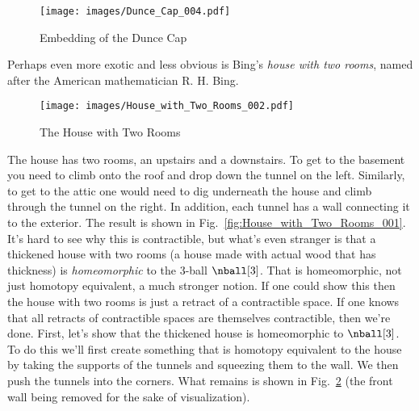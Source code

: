 \documentclass{book}                                                           %
\begin{document}
                \begin{figure}[H]
                    \centering
                    \captionsetup{type=figure}
                    \texttt{[image: images/Dunce\_Cap\_004.pdf]}
                    \caption{Embedding of the Dunce Cap}
                    \label{fig:Dunce_Cap_003}
                \end{figure}
                Perhaps even more exotic and less obvious is Bing's
                \textit{house with two rooms}, named after the American
                mathematician R. H. Bing.
                \begin{figure}[H]
                    \centering
                    \captionsetup{type=figure}
                    \texttt{[image: images/House\_with\_Two\_Rooms\_002.pdf]}
                    \caption{The House with Two Rooms}
                    \label{fig:House_with_Two_Rooms_002}
                \end{figure}
                The house has two rooms, an upstairs and a downstairs. To get to
                the basement you need to climb onto the roof and drop down the
                tunnel on the left. Similarly, to get to the attic one would
                need to dig underneath the house and climb through the tunnel on
                the right. In addition, each tunnel has a wall connecting it to
                the exterior. The result is shown in
                Fig.~\ref{fig:House_with_Two_Rooms_001}. It's hard to see why
                this is contractible, but what's even stranger is that a
                thickened house with two rooms (a house made with actual wood
                that has thickness) is \textit{homeomorphic} to the 3-ball
                $\nball[3]$. That is homeomorphic, not just homotopy equivalent,
                a much stronger notion. If one could show this then the house
                with two rooms is just a retract of a contractible space. If one
                knows that all retracts of contractible spaces are themselves
                contractible, then we're done. First, let's show that the
                thickened house is homeomorphic to $\nball[3]$. To do this we'll
                first create something that is homotopy equivalent to the house
                by taking the supports of the tunnels and squeezing them to the
                wall. We then push the tunnels into the corners. What remains is
                shown in Fig.~\ref{fig:House_with_Two_Rooms_002} (the front
                wall being removed for the sake of visualization).
                \par\hfill\par
\end{document}
